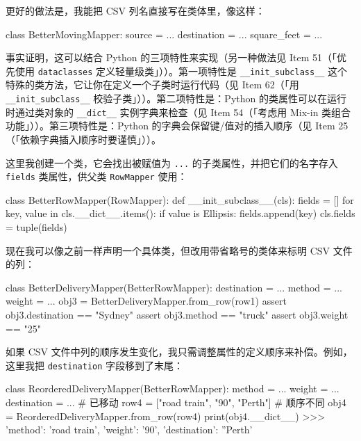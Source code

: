 更好的做法是，我能把 CSV 列名直接写在类体里，像这样：

\begin{codebox}[python]
class BetterMovingMapper:
    source = ...
    destination = ...
    square_feet = ...
\end{codebox}

事实证明，这可以结合 Python 的三项特性来实现（另一种做法见 Item 51（「优先使用 \texttt{dataclasses} 定义轻量级类」））。第一项特性是 \texttt{\_\_init\_subclass\_\_} 这个特殊的类方法，它让你在定义一个子类时运行代码（见 Item 62（「用 \texttt{\_\_init\_subclass\_\_} 校验子类」））。第二项特性是：Python 的类属性可以在运行时通过类对象的 \texttt{\_\_dict\_\_} 实例字典来检查（见 Item 54（「考虑用 Mix-in 类组合功能」））。第三项特性是：Python 的字典会保留键/值对的插入顺序（见 Item 25（「依赖字典插入顺序时要谨慎」））。

这里我创建一个类，它会找出被赋值为 \texttt{...} 的子类属性，并把它们的名字存入 \texttt{fields} 类属性，供父类 \texttt{RowMapper} 使用：

\begin{codebox}[python]
class BetterRowMapper(RowMapper):
    def __init_subclass__(cls):
        fields = []
        for key, value in cls.__dict__.items():
            if value is Ellipsis:
                fields.append(key)
        cls.fields = tuple(fields)
\end{codebox}

现在我可以像之前一样声明一个具体类，但改用带省略号的类体来标明 CSV 文件的列：

\begin{codebox}[python]
class BetterDeliveryMapper(BetterRowMapper):
    destination = ...
    method = ...
    weight = ...
obj3 = BetterDeliveryMapper.from_row(row1)
assert obj3.destination == "Sydney"
assert obj3.method == "truck"
assert obj3.weight == "25"
\end{codebox}

如果 CSV 文件中列的顺序发生变化，我只需调整属性的定义顺序来补偿。例如，这里我把 \texttt{destination} 字段移到了末尾：

\begin{codebox}[python]
class ReorderedDeliveryMapper(BetterRowMapper):
    method = ...
    weight = ...
    destination = ...  # 已移动
row4 = ["road train", "90", "Perth"]  # 顺序不同
obj4 = ReorderedDeliveryMapper.from_row(row4)
print(obj4.__dict__)
>>>
{'method': 'road train', 'weight': '90', 'destination':
''Perth'}
\end{codebox}

